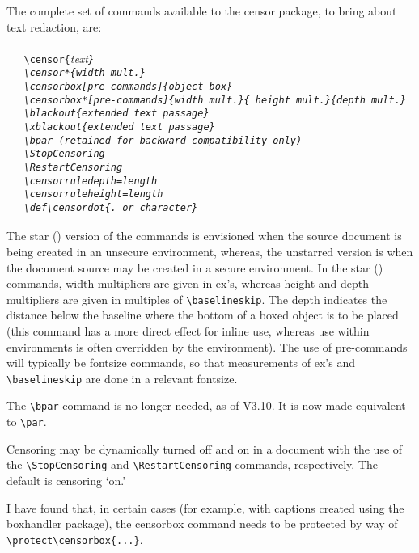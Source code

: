 \documentclass{article}
\begin{document}
The complete set of commands available to the \textsf{censor} package,
to bring about text redaction, are:\\
{~\\
\verb|   \censor{|\it text\tt\}\\
\verb|   \censor*{|\it width mult.\tt\}\\
\verb|   \censorbox[|\it pre-commands\tt]\{\it object box\tt\}\\
\verb|   \censorbox*[|\it pre-commands\tt]\{\it width mult.\tt\}\{\it 
height mult.\tt\}\{\it depth mult.\tt\}\\
\verb|   \blackout{|\it extended text passage\tt\}\\
\verb|   \xblackout{|\it extended text passage\tt\}\\
\verb|   \bpar| \rmfamily\upshape(\it retained for backward compatibility
              only\upshape)\\
\verb|   \StopCensoring|\\
\verb|   \RestartCensoring|\\
\verb|   \censorruledepth=|\it length\\
\verb|   \censorruleheight=|length\\
\verb|   \def\censordot{.| \upshape or \it character\tt\}\\
~\\}
The star ({\tt*}) version of the commands is envisioned when the source
document is being created in an unsecure environment, whereas, the
unstarred version is when the document source may be created in a secure
environment.
In the star ({\tt*}) commands, width multipliers are given in ex's,
whereas height and depth multipliers are given in multiples of
\verb|\baselineskip|.  The depth indicates the distance below the
baseline where the bottom of a boxed object is to be placed (this
command has a more direct effect for inline use, whereas use within
environments is often overridden by the environment).  The use of
pre-commands will typically be fontsize commands, so that measurements
of ex's and \verb|\baselineskip| are done in a relevant fontsize.

The \verb|\bpar| command is no longer needed, as of V3.10.  It is now
made equivalent to \verb|\par|.

Censoring may be dynamically turned off and on in a document with the
use of the \verb|\StopCensoring| and \verb|\RestartCensoring| commands,
respectively.  The default is censoring `on.'  

I have found that, in certain cases (for example, with captions created
using the \textsf{boxhandler} package), the censorbox command needs to
be protected by way of \verb|\protect\censorbox{...}|.
\end{document}
